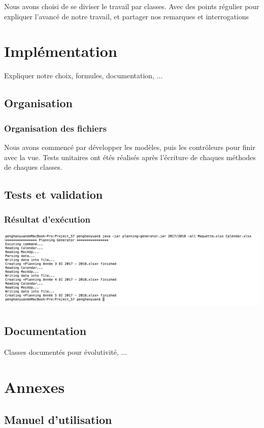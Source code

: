 \documentclass{polytech/polytech}
\begin{document}
	Nous avons choisi de se diviser le travail par classes.
	Avec des points régulier pour expliquer l'avancé de notre travail, et partager nos remarques et
	interrogations

	\chapter{Implémentation}

	Expliquer notre choix, formules, documentation, ...

	\section{Organisation}

	\subsection{Organisation des fichiers}

	Nous avons commencé par développer les modèles, puis les contrôleurs pour finir avec la vue.
	Tests unitaires ont étés réalisés après l'écriture de chaques méthodes de chaques classes.

	\section{Tests et validation}
	\subsection{Résultat d'exécution}
	\includegraphics[width=\textwidth]{./img/excution_result.png}
	\section{Documentation}

	Classes documentés pour évolutivité, ...

	\chapter{Annexes}

	\section{Manuel d'utilisation}
	
\end{document}
